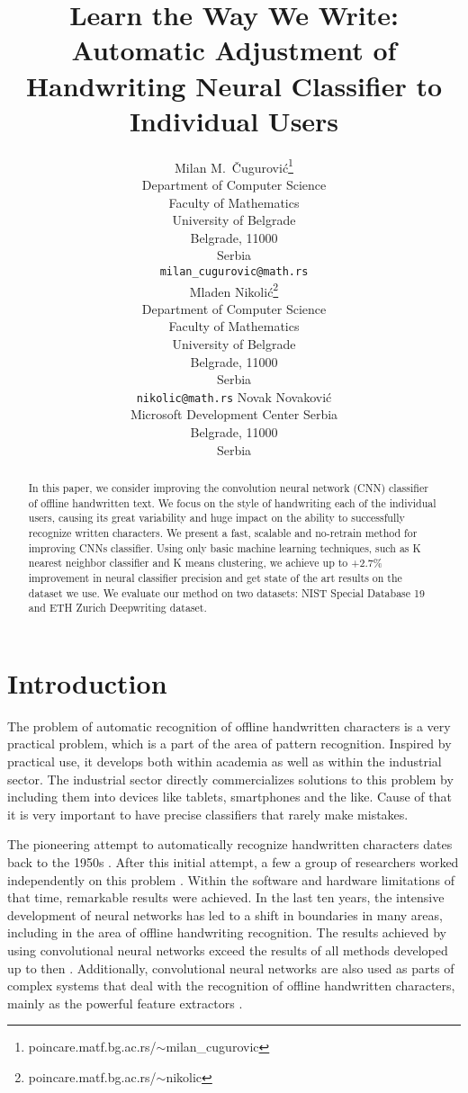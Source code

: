 \documentclass{article}
\title{Learn the Way We Write: Automatic Adjustment of %
Handwriting Neural Classifier to Individual Users}
\author{%
  Milan M.~Čugurović\thanks{poincare.matf.bg.ac.rs/$\sim$milan\_cugurovic} \\
  Department of Computer Science\\
  Faculty of Mathematics\\
  University of Belgrade\\
  Belgrade, 11000\\
  Serbia\\
  \texttt{milan\_cugurovic@math.rs} \\
  \And
  Mladen Nikolić\thanks{poincare.matf.bg.ac.rs/$\sim$nikolic} \\
  Department of Computer Science\\
  Faculty of Mathematics\\
  University of Belgrade\\
  Belgrade, 11000\\
  Serbia\\
  \texttt{nikolic@math.rs}
  \And
  Novak Novaković \\
  Microsoft Development Center Serbia\\
  Belgrade, 11000\\
  Serbia\\
}
\begin{document}
\maketitle

\begin{abstract}
  In this paper, we consider improving the convolution neural network (CNN) classifier of offline handwritten text.  
  We focus on the style of handwriting each of the individual users, causing its great variability and huge impact on the ability to successfully recognize written characters. 
  We present a fast, scalable and no-retrain method for improving CNNs classifier. 
  Using only basic machine learning techniques, such as K nearest neighbor classifier and K means clustering, we achieve up to +2.7\% improvement in neural classifier precision and get state of the art results on the dataset we use. 
  We evaluate our method on two datasets: NIST Special Database 19 and ETH Zurich Deepwriting dataset. 
\end{abstract}

\section{Introduction}
The problem of automatic recognition of offline handwritten characters is a very practical problem, which is a part of the area of pattern recognition. 
Inspired by practical use, it develops both within academia as well as within the industrial sector. 
The industrial sector directly commercializes solutions to this problem by including them into devices like tablets, smartphones and the like. 
Cause of that it is very important to have precise classifiers that rarely make mistakes. 

The pioneering attempt to automatically recognize handwritten characters dates back to the 1950s \citet{leedham}. 
After this initial attempt, a few a group of researchers worked independently on this problem \citet{plamondon}. 
Within the software and hardware limitations of that time, remarkable results were achieved. 
In the last ten years, the intensive development of neural networks has led to a shift in boundaries in many areas, 
including in the area of offline handwriting recognition. 
The results achieved by using convolutional neural networks exceed the results of all methods developed up to then \citet{cnnbest1} \citet{cnnbest2} \citet{cnnbest3}. 
Additionally, convolutional neural networks are also used as parts of complex systems that deal with the recognition of offline handwritten characters, 
mainly as the powerful feature extractors \citet{cnnrelated1} \citet{cnnrelated2} \citet{cnnrelated3}.
\end{document}
